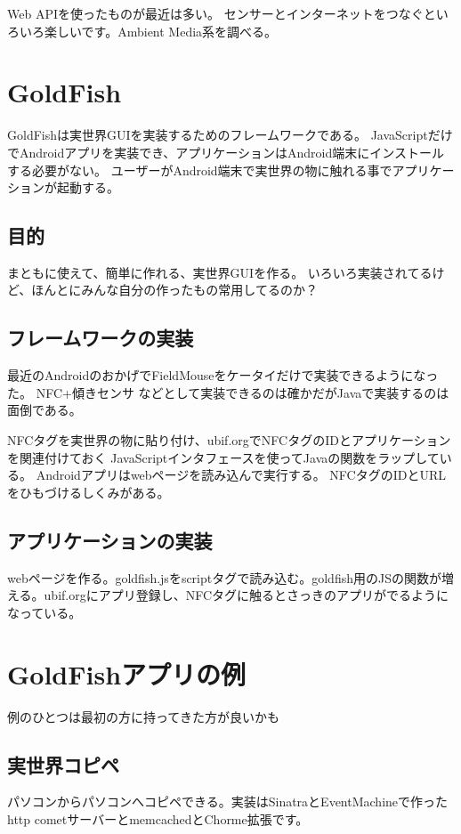 Web APIを使ったものが最近は多い。
センサーとインターネットをつなぐといろいろ楽しいです。Ambient Media系を調べる。

\section{GoldFish}

GoldFishは実世界GUIを実装するためのフレームワークである。
JavaScriptだけでAndroidアプリを実装でき、アプリケーションはAndroid端末にインストールする必要がない。
ユーザーがAndroid端末で実世界の物に触れる事でアプリケーションが起動する。

\subsection{目的}

まともに使えて、簡単に作れる、実世界GUIを作る。
いろいろ実装されてるけど、ほんとにみんな自分の作ったもの常用してるのか？

\subsection{フレームワークの実装}

最近のAndroidのおかげでFieldMouseをケータイだけで実装できるようになった。
NFC+傾きセンサ などとして実装できるのは確かだがJavaで実装するのは面倒である。

NFCタグを実世界の物に貼り付け、ubif.orgでNFCタグのIDとアプリケーションを関連付けておく
JavaScriptインタフェースを使ってJavaの関数をラップしている。
Androidアプリはwebページを読み込んで実行する。
NFCタグのIDとURLをひもづけるしくみがある。

\subsection{アプリケーションの実装}

webページを作る。goldfish.jsをscriptタグで読み込む。goldfish用のJSの関数が増える。ubif.orgにアプリ登録し、NFCタグに触るとさっきのアプリがでるようになっている。


\section{GoldFishアプリの例}

例のひとつは最初の方に持ってきた方が良いかも

\subsection{実世界コピペ}
パソコンからパソコンへコピペできる。実装はSinatraとEventMachineで作ったhttp cometサーバーとmemcachedとChorme拡張です。

